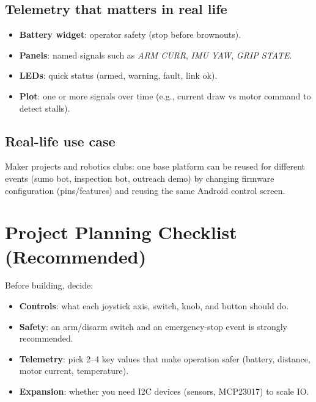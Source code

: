 \subsection*{Telemetry that matters in real life}
\begin{itemize}
    \item \textbf{Battery widget}: operator safety (stop before brownouts).
    \item \textbf{Panels}: named signals such as \textit{ARM CURR}, \textit{IMU YAW}, \textit{GRIP STATE}.
    \item \textbf{LEDs}: quick status (armed, warning, fault, link ok).
    \item \textbf{Plot}: one or more signals over time (e.g., current draw vs motor command to detect stalls).
\end{itemize}

\subsection*{Real-life use case}
Maker projects and robotics clubs: one base platform can be reused for different events (sumo bot, inspection bot, outreach demo) by changing firmware configuration (pins/features) and reusing the same Android control screen.

\section{Project Planning Checklist (Recommended)}
\label{sec:planning-checklist}

Before building, decide:

\begin{itemize}
    \item \textbf{Controls}: what each joystick axis, switch, knob, and button should do.
    \item \textbf{Safety}: an arm/disarm switch and an emergency-stop event is strongly recommended.
    \item \textbf{Telemetry}: pick 2--4 key values that make operation safer (battery, distance, motor current, temperature).
    \item \textbf{Expansion}: whether you need I2C devices (sensors, MCP23017) to scale IO.
\end{itemize}